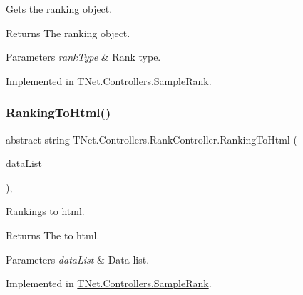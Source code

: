 Gets the ranking object. 

\begin{DoxyReturn}{Returns}
The ranking object.
\end{DoxyReturn}

\begin{DoxyParams}{Parameters}
{\em rank\+Type} & Rank type.\\
\hline
\end{DoxyParams}


Implemented in \mbox{\hyperlink{class_t_net_1_1_controllers_1_1_sample_rank_a29b6d1de9fab8703d209385b6a8de185}{T\+Net.\+Controllers.\+Sample\+Rank}}.

\mbox{\label{class_t_net_1_1_controllers_1_1_rank_controller_a453b81a53f72a30914f32ecded63dae2}} 
\subsubsection{\texorpdfstring{Ranking\+To\+Html()}{RankingToHtml()}}
{\footnotesize\ttfamily abstract string T\+Net.\+Controllers.\+Rank\+Controller.\+Ranking\+To\+Html (\begin{DoxyParamCaption}\item[{I\+List$<$ object $>$}]{data\+List }\end{DoxyParamCaption})\hspace{0.3cm}{\ttfamily [protected]}, {}}



Rankings to html. 

\begin{DoxyReturn}{Returns}
The to html.
\end{DoxyReturn}

\begin{DoxyParams}{Parameters}
{\em data\+List} & Data list.\\
\hline
\end{DoxyParams}


Implemented in \mbox{\hyperlink{class_t_net_1_1_controllers_1_1_sample_rank_ae2de6cc2ed3dcdcd29f6df49c406da07}{T\+Net.\+Controllers.\+Sample\+Rank}}.

\mbox{\label{class_t_net_1_1_controllers_1_1_rank_controller_a61adb0bb3db269494ac6c71f6a1f7c27}} 
